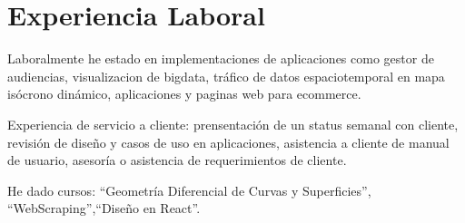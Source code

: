 \documentclass[%
	       doublesided,
	       paper=a4,
	       fontsize=10pt
	      ]{my-resume}
\begin{document}
{    \section[\faGears]{Experiencia Laboral}
    {\normalsize
    Laboralmente he estado en implementaciones de aplicaciones como gestor de audiencias, visualizacion de bigdata, tráfico de datos espaciotemporal en mapa isócrono dinámico, aplicaciones y paginas web para ecommerce.

    Experiencia de servicio a cliente: prensentación de un status semanal con cliente, revisión de diseño y casos de uso en aplicaciones, asistencia a cliente de manual de usuario, asesoría o asistencia de requerimientos de cliente. 

    He dado cursos: ``Geometría Diferencial de Curvas y Superficies'', ``WebScraping'',``Diseño en React''. 

}}
\end{document}
